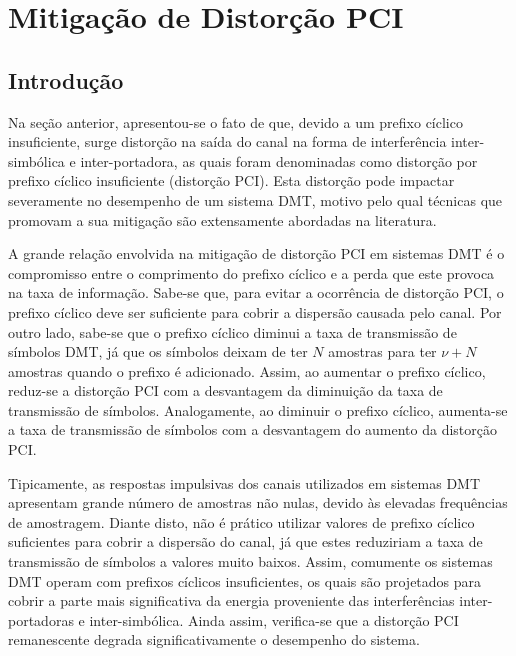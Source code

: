 \chapter{Mitigação de Distorção PCI}
\label{sec:mitigacao_pci}

\section{Introdução}

Na seção anterior, apresentou-se o fato de que, devido a um prefixo cíclico insuficiente, surge distorção na saída do canal na forma de interferência inter-simbólica e inter-portadora, as quais foram denominadas como distorção por prefixo cíclico insuficiente (distorção PCI). Esta distorção pode impactar severamente no desempenho de um sistema DMT, motivo pelo qual técnicas que promovam a sua mitigação são extensamente abordadas na literatura.

A grande relação envolvida na mitigação de distorção PCI em sistemas DMT é o compromisso entre o comprimento do prefixo cíclico e a perda que este provoca na taxa de informação. Sabe-se que, para evitar a ocorrência de distorção PCI, o prefixo cíclico deve ser suficiente para cobrir a dispersão causada pelo canal. Por outro lado, sabe-se que o prefixo cíclico diminui a taxa de transmissão de símbolos DMT, já que os símbolos deixam de ter $N$ amostras para ter $\nu + N$ amostras quando o prefixo é adicionado. Assim, ao aumentar o prefixo cíclico, reduz-se a distorção PCI com a desvantagem da diminuição da taxa de transmissão de símbolos. Analogamente, ao diminuir o prefixo cíclico, aumenta-se a taxa de transmissão de símbolos com a desvantagem do aumento da distorção PCI.

Tipicamente, as respostas impulsivas dos canais utilizados em sistemas DMT apresentam grande número de amostras não nulas, devido às elevadas frequências de amostragem. Diante disto, não é prático utilizar valores de prefixo cíclico suficientes para cobrir a dispersão do canal, já que estes reduziriam a taxa de transmissão de símbolos a valores muito baixos. Assim, comumente os sistemas DMT operam com prefixos cíclicos insuficientes, os quais são projetados para cobrir a parte mais significativa da energia proveniente das interferências inter-portadoras e inter-simbólica. Ainda assim, verifica-se que a distorção PCI remanescente degrada significativamente o desempenho do sistema.

